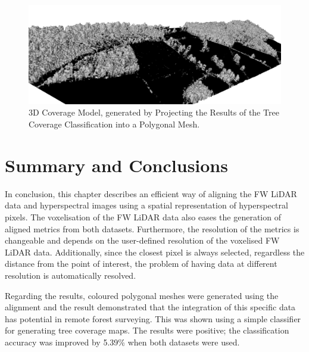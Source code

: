 \documentclass{subfiles}
\begin{document}
\begin{figure} [h!]
	\centering
	\includegraphics[width=\textwidth]{img/CoverageProjected}
	\caption[3D Coverage Model]{3D Coverage Model, generated by Projecting the Results of the Tree Coverage Classification into a Polygonal Mesh.}
	\label{fig:CoverageProjectedPolygon}
\end{figure}

\newpage\newpage
\section {Summary and Conclusions}
\par In conclusion, this chapter describes an efficient way of aligning the FW LiDAR data and hyperspectral images using a spatial representation of hyperspectral pixels. The voxelisation of the FW LiDAR data also eases the generation of aligned metrics from both datasets. Furthermore, the resolution of the metrics is changeable and depends on the user-defined resolution of the voxelised FW LiDAR data. Additionally, since the closest pixel is always selected, regardless the distance from the point of interest, the problem of having data at different resolution is automatically resolved. 

\par Regarding the results, coloured polygonal meshes were generated using the alignment and the result demonstrated that the integration of this specific data has potential in remote forest surveying. This was shown using a simple classifier for generating tree coverage maps. The results were positive; the classification accuracy was improved by 5.39\% when both datasets were used.
\end{document}
